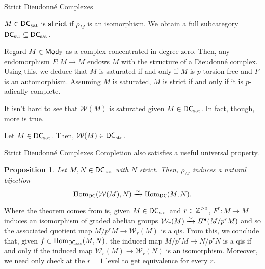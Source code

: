 \documentclass[aspectratio=1610]{beamer}
\newcommand{\DC}{\mathsf{DC}}
\newcommand{\sat}{\textup{sat}}
\newcommand{\str}{\textup{str}}
\newcommand{\W}{\mathcal{W}}
\newtheorem{proposition}{Proposition}
\begin{document}
\begin{frame}{Strict Dieudonn\'{e} Complexes}
\begin{definition}
$M\in\DC_{\sat}$ is \textbf{strict} if $\rho_M$ is an isomorphism. We obtain a full subcategory $\DC_{\str}\subset\DC_{\sat}$.
\end{definition}

\begin{example}
Regard $M\in\operatorname{\mathsf{Mod}}_{\mathbb{Z}}$ as a complex concentrated in degree zero. Then, any endomorphism $F: M\to M$ endows $M$ with the structure of a Dieudonn\'{e} complex. Using this, we deduce that $M$ is saturated if and only if $M$ is $p$-torsion-free and $F$ is an automorphism. Assuming $M$ is saturated, $M$ is strict if and only if it is $p$-adically complete.
\end{example}

It isn't hard to see that $\W(M)$ is saturated given $M\in\DC_{\sat}$. In fact, though, more is true.

\begin{theorem}
Let $M\in\DC_{\sat}$. Then, $\W(M)\in\DC_{\str}$.
\end{theorem}
\end{frame}

\begin{frame}{Strict Dieudonn\'{e} Complexes}
Completion also satisfies a useful universal property.

\begin{proposition}
Let $M,N\in\DC_{\sat}$ with $N$ strict. Then, $\rho_M$ induces a natural bijection 
$$\Hom_{\DC}(\W(M),N)\xto{\sim}\Hom_{\DC}(M,N).$$
\end{proposition}

Where the theorem comes from is, given $M\in\DC_{\sat}$ and $r\in\mathbb{Z}^{\geq0}$, $F^r: M\to M$ induces an isomorphism of graded abelian groups $\W_r(M)\xto{\sim}H^{\bullet}(M/p^rM)$ and so the associated quotient map $M/p^rM\to\W_r(M)$ is a qis. From this, we conclude that, given $f\in\Hom_{\DC_{\sat}}(M,N)$, the induced map $M/p^rM\to N/p^rN$ is a qis if and only if the induced map $\W_r(M)\to\W_r(N)$ is an isomorphism. Moreover, we need only check at the $r=1$ level to get equivalence for every $r$.
\end{frame}
\end{document}
